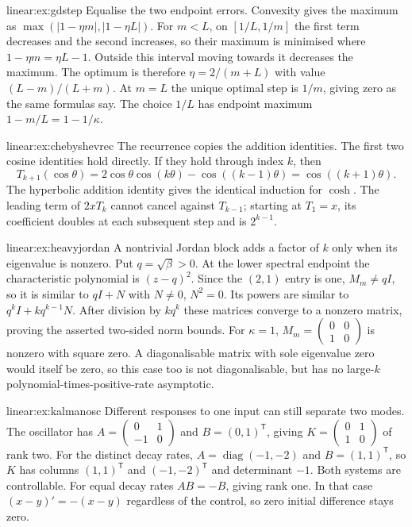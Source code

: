 \begin{solution}{linear:ex:gdstep}
\idea Equalise the two endpoint errors.
\writeup Convexity gives the maximum as $\max(|1-\eta m|,|1-\eta L|)$. For $m<L$, on $[1/L,1/m]$ the first term decreases and the second increases, so their maximum is minimised where $1-\eta m=\eta L-1$. Outside this interval moving towards it decreases the maximum. The optimum is therefore $\eta=2/(m+L)$ with value $(L-m)/(L+m)$. At $m=L$ the unique optimal step is $1/m$, giving zero as the same formulas say. The choice $1/L$ has endpoint maximum $1-m/L=1-1/\kappa$.
\end{solution}
\begin{solution}{linear:ex:chebyshevrec}
\idea The recurrence copies the addition identities.
\writeup The first two cosine identities hold directly. If they hold through index $k$, then
\[T_{k+1}(\cos\theta)=2\cos\theta\cos(k\theta)-\cos((k-1)\theta)=\cos((k+1)\theta).
\]
The hyperbolic addition identity gives the identical induction for $\cosh$. The leading term of $2xT_k$ cannot cancel against $T_{k-1}$; starting at $T_1=x$, its coefficient doubles at each subsequent step and is $2^{k-1}$.
\end{solution}
\begin{solution}{linear:ex:heavyjordan}
\idea A nontrivial Jordan block adds a factor of $k$ only when its eigenvalue is nonzero.
\writeup Put $q=\sqrt\beta>0$. At the lower spectral endpoint the characteristic polynomial is $(z-q)^2$. Since the $(2,1)$ entry is one, $M_m\ne qI$, so it is similar to $qI+N$ with $N\ne0$, $N^2=0$. Its powers are similar to $q^kI+kq^{k-1}N$. After division by $kq^k$ these matrices converge to a nonzero matrix, proving the asserted two-sided norm bounds. For $\kappa=1$, $M_m=\left(\begin{smallmatrix}0&0\\1&0\end{smallmatrix}\right)$ is nonzero with square zero. A diagonalisable matrix with sole eigenvalue zero would itself be zero, so this case too is not diagonalisable, but has no large-$k$ polynomial-times-positive-rate asymptotic.
\end{solution}
\begin{solution}{linear:ex:kalmanosc}
\idea Different responses to one input can still separate two modes.
\writeup The oscillator has $A=\left(\begin{smallmatrix}0&1\\-1&0\end{smallmatrix}\right)$ and $B=(0,1)^{\mathsf T}$, giving $K=\left(\begin{smallmatrix}0&1\\1&0\end{smallmatrix}\right)$ of rank two. For the distinct decay rates, $A=\operatorname{diag}(-1,-2)$ and $B=(1,1)^{\mathsf T}$, so $K$ has columns $(1,1)^{\mathsf T}$ and $(-1,-2)^{\mathsf T}$ and determinant $-1$. Both systems are controllable. For equal decay rates $AB=-B$, giving rank one. In that case $(x-y)'=-(x-y)$ regardless of the control, so zero initial difference stays zero.
\end{solution}
